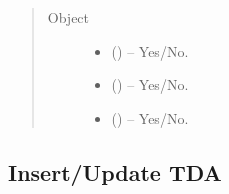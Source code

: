 \documentclass[letterpaper,10pt,english,openany,oneside]{sphinxmanual}
\begin{document}
\begin{fulllineitems}
\begin{sphinxVerbatim}[commandchars=\\\{\}]
           
           
           
           
           
           
    \PYG{p}{]}
\end{sphinxVerbatim}
\begin{quote}\begin{description}
\item[{Object}] \leavevmode\begin{itemize}
\item {} 
\sphinxAtStartPar
{} () – Yes/No.

\item {} 
\sphinxAtStartPar
{} () – Yes/No.

\item {} 
\sphinxAtStartPar
{} () – Yes/No.

\end{itemize}

\end{description}\end{quote}

\end{fulllineitems}



\subsection{Insert/Update TDA}
\label{\detokenize{api-last-mile/v1:insert-update-tda}}
\end{document}
